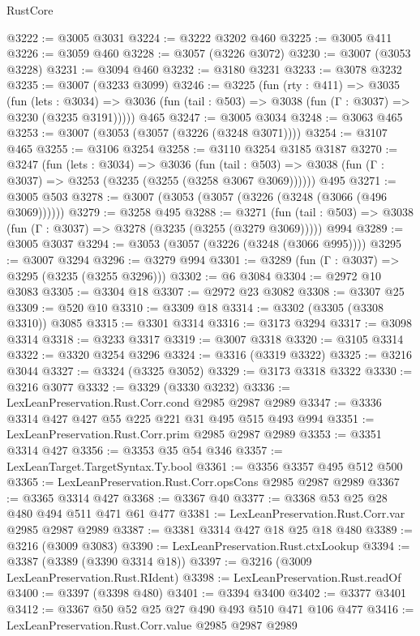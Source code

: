 \begin{lexlean}{RustCore}
\begin{coremodule}
@3222 := @3005 @3031
@3224 := @3222 @3202 @460
@3225 := @3005 @411
@3226 := @3059 @460
@3228 := @3057 (@3226 @3072)
@3230 := @3007 (@3053 @3228)
@3231 := @3094 @460
@3232 := @3180 @3231
@3233 := @3078 @3232
@3235 := @3007 (@3233 @3099)
@3246 := @3225
    (fun (rty : @411) =>
    @3035
      (fun (lets : @3034) =>
      @3036 (fun (tail : @503) => @3038 (fun (Γ : @3037) => @3230 (@3235 @3191)))))
    @465
@3247 := @3005 @3034
@3248 := @3063 @465
@3253 := @3007 (@3053 (@3057 (@3226 (@3248 @3071))))
@3254 := @3107 @465
@3255 := @3106 @3254
@3258 := @3110 @3254 @3185 @3187
@3270 := @3247
    (fun (lets : @3034) =>
    @3036
      (fun (tail : @503) => @3038 (fun (Γ : @3037) => @3253 (@3235 (@3255 (@3258 @3067 @3069))))))
    @495
@3271 := @3005 @503
@3278 := @3007 (@3053 (@3057 (@3226 (@3248 (@3066 (@496 @3069))))))
@3279 := @3258 @495
@3288 := @3271
    (fun (tail : @503) => @3038 (fun (Γ : @3037) => @3278 (@3235 (@3255 (@3279 @3069)))))
    @994
@3289 := @3005 @3037
@3294 := @3053 (@3057 (@3226 (@3248 (@3066 @995))))
@3295 := @3007 @3294
@3296 := @3279 @994
@3301 := @3289 (fun (Γ : @3037) => @3295 (@3235 (@3255 @3296)))
@3302 := @6 @3084
@3304 := @2972 @10 @3083
@3305 := @3304 @18
@3307 := @2972 @23 @3082
@3308 := @3307 @25
@3309 := @520 @10
@3310 := @3309 @18
@3314 := @3302 (@3305 (@3308 @3310)) @3085
@3315 := @3301 @3314
@3316 := @3173 @3294
@3317 := @3098 @3314
@3318 := @3233 @3317
@3319 := @3007 @3318
@3320 := @3105 @3314
@3322 := @3320 @3254 @3296
@3324 := @3316 (@3319 @3322)
@3325 := @3216 @3044
@3327 := @3324 (@3325 @3052)
@3329 := @3173 @3318 @3322
@3330 := @3216 @3077
@3332 := @3329 (@3330 @3232)
@3336 := LexLeanPreservation.Rust.Corr.cond @2985 @2987 @2989
@3347 := @3336 @3314 @427 @427 @55 @225 @221 @31 @495 @515 @493 @994
@3351 := LexLeanPreservation.Rust.Corr.prim @2985 @2987 @2989
@3353 := @3351 @3314 @427
@3356 := @3353 @35 @54 @346
@3357 := LexLeanTarget.TargetSyntax.Ty.bool
@3361 := @3356 @3357 @495 @512 @500
@3365 := LexLeanPreservation.Rust.Corr.opsCons @2985 @2987 @2989
@3367 := @3365 @3314 @427
@3368 := @3367 @40
@3377 := @3368 @53 @25 @28 @480 @494 @511 @471 @61 @477
@3381 := LexLeanPreservation.Rust.Corr.var @2985 @2987 @2989
@3387 := @3381 @3314 @427 @18 @25 @18 @480
@3389 := @3216 (@3009 @3083)
@3390 := LexLeanPreservation.Rust.ctxLookup
@3394 := @3387 (@3389 (@3390 @3314 @18))
@3397 := @3216 (@3009 LexLeanPreservation.Rust.RIdent)
@3398 := LexLeanPreservation.Rust.readOf
@3400 := @3397 (@3398 @480)
@3401 := @3394 @3400
@3402 := @3377 @3401
@3412 := @3367 @50 @52 @25 @27 @490 @493 @510 @471 @106 @477
@3416 := LexLeanPreservation.Rust.Corr.value @2985 @2987 @2989

\end{coremodule}
\end{lexlean}
